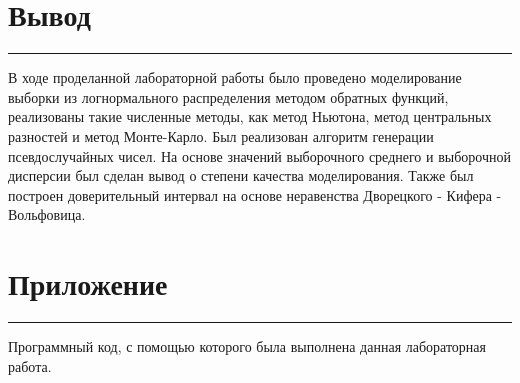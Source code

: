 \documentclass[a4paper, 14pt]{extarticle}
\begin{document}
\section{Вывод}\vspace{-20pt}\rule{\linewidth}{0.1mm}

В ходе проделанной лабораторной работы было проведено моделирование выборки из 
логнормального распределения методом обратных функций, реализованы такие численные 
методы, как метод Ньютона, метод центральных разностей и метод Монте-Карло. Был реализован 
алгоритм генерации псевдослучайных чисел. На основе значений выборочного среднего и 
выборочной дисперсии был сделан вывод о степени качества моделирования. Также был 
построен доверительный интервал на основе неравенства Дворецкого - Кифера - Вольфовица.


\newpage

\section{Приложение}\vspace{-20pt}\rule{\linewidth}{0.1mm}

Программный код, с помощью которого была выполнена данная лабораторная работа.\\
\end{document}
